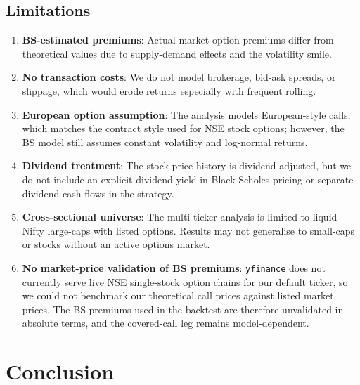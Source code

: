 \documentclass[12pt, a4paper]{article}
\begin{document}
\subsection{Limitations}

\begin{enumerate}
    \item \textbf{BS-estimated premiums}: Actual market option premiums differ from theoretical values due to supply-demand effects and the volatility smile.
    \item \textbf{No transaction costs}: We do not model brokerage, bid-ask spreads, or slippage, which would erode returns especially with frequent rolling.
    \item \textbf{European option assumption}: The analysis models European-style calls, which matches the contract style used for NSE stock options; however, the BS model still assumes constant volatility and log-normal returns.
    \item \textbf{Dividend treatment}: The stock-price history is dividend-adjusted, but we do not include an explicit dividend yield in Black-Scholes pricing or separate dividend cash flows in the strategy.
    \item \textbf{Cross-sectional universe}: The multi-ticker analysis is limited to liquid Nifty large-caps with listed options. Results may not generalise to small-caps or stocks without an active options market.
    \item \textbf{No market-price validation of BS premiums}: \texttt{yfinance} does not currently serve live NSE single-stock option chains for our default ticker, so we could not benchmark our theoretical call prices against listed market prices. The BS premiums used in the backtest are therefore unvalidated in absolute terms, and the covered-call leg remains model-dependent.
\end{enumerate}


\section{Conclusion}
\end{document}
